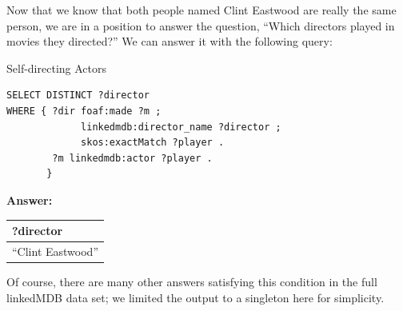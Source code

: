 \begin{challenge}
Now that we know that both people named Clint Eastwood are really the
same person, we are in a position to answer the question, ``Which
directors played in movies they directed?'' We can answer it with the
following query:

\begin{query}Self-directing Actors\end{query}
\begin{lstlisting}
SELECT DISTINCT ?director
WHERE { ?dir foaf:made ?m ;
             linkedmdb:director_name ?director ;
             skos:exactMatch ?player . 
        ?m linkedmdb:actor ?player .
       }
\end{lstlisting}

\textbf{\textbf{Answer:}}

\begin{tabular}{|l|}
\hline
?director\\
\hline
``Clint Eastwood''\\
\hline
\end{tabular}
\end{challenge}

Of course, there are many other answers satisfying this condition in the full 
linkedMDB data set; we limited the output to a singleton here for simplicity. 

